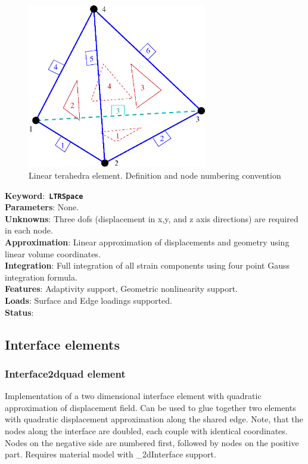 \documentclass[a4paper]{article}
\newcommand{\descitem}[1]{{\noindent \bf #1}:}
\newcommand{\elemkeyword}[1]{\descitem{Keyword}~{\bf \texttt{#1}}}
\begin{document}
\begin{figure}[tb]
\else
 \centerline{\includegraphics[width=0.7\textwidth]{tetrahedra_lin.eps}}
\fi
\caption{Linear terahedra element. Definition and node numbering convention}
\label{lintetrahedron_fig}
\end{figure}

\elemkeyword{LTRSpace}\\
\descitem{Parameters} None.\\
\descitem{Unknowns}
Three dofs (displacement in x,y, and z axis directions) are required in each node.\\
\descitem{Approximation} Linear approximation of displacements and
geometry using linear volume coordinates.\\
\descitem{Integration}
Full integration of all strain components using four point Gauss integration formula.\\
\descitem{Features} Adaptivity support, Geometric nonlinearity support.\\
\descitem{Loads} Surface and Edge loadings supported.\\
\descitem{Status} 

\subsection{Interface elements}
\subsubsection{Interface2dquad element}
Implementation of a two dimensional interface element with quadratic
approximation of displacement field. Can be used to glue together two elements with quadratic displacement approximation along the shared edge. Note, that the nodes along the interface are doubled, each couple with identical coordinates. Nodes on the negative side are numbered first, followed by nodes on the positive part. Requires material model with \_2dInterface support. 
\end{document}
